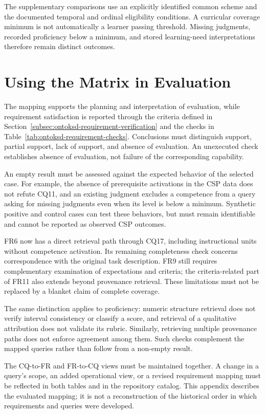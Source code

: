 The supplementary comparisons use an explicitly identified common
scheme and the documented temporal and ordinal eligibility conditions.
A curricular coverage minimum is not automatically a learner passing
threshold. Missing judgments, recorded proficiency below a minimum,
and stored learning-need interpretations therefore remain distinct
outcomes.

\section{Using the Matrix in Evaluation}

The mapping supports the planning and interpretation of evaluation,
while requirement satisfaction is reported through the criteria defined
in Section~\ref{subsec:ontoksd-requirement-verification} and the checks
in Table~\ref{tab:ontoksd-requirement-checks}. Conclusions must distinguish
support, partial support, lack of support, and absence of evaluation.
An unexecuted check establishes absence of evaluation, not failure of
the corresponding capability.

An empty result must be assessed against the expected behavior of the
selected case. For example, the absence of prerequisite activations in
the CSP data does not refute CQ11, and an existing judgment excludes a
competence from a query asking for missing judgments even when its level
is below a minimum. Synthetic positive and control cases can test these
behaviors, but must remain identifiable and cannot be reported as
observed CSP outcomes.

FR6 now has a direct retrieval path through CQ17, including instructional
units without competence activation. Its remaining completeness check
concerns correspondence with the original task description. FR9 still
requires complementary examination of expectations and criteria; the
criteria-related part of FR11 also extends beyond provenance retrieval.
These limitations must not be replaced by a blanket claim of complete
coverage.

The same distinction applies to proficiency: numeric structure retrieval
does not verify interval consistency or classify a score, and retrieval
of a qualitative attribution does not validate its rubric. Similarly,
retrieving multiple provenance paths does not enforce agreement among
them. Such checks complement the mapped queries rather than follow
from a non-empty result.

The CQ-to-FR and FR-to-CQ views must be maintained together. A change
in a query's scope, an added operational view, or a revised requirement
mapping must be reflected in both tables and in the repository catalog.
This appendix describes the evaluated mapping; it is not a reconstruction
of the historical order in which requirements and queries were developed.
